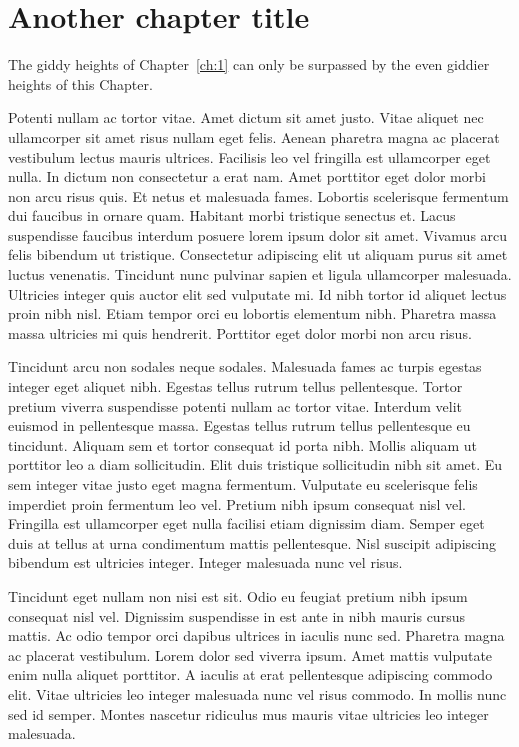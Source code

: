 
\chapter{Another chapter title} \label{ch:2}


The giddy heights of Chapter~\ref{ch:1} can only be surpassed by the even giddier heights of this Chapter.

Potenti nullam ac tortor vitae. Amet dictum sit amet justo. Vitae aliquet nec ullamcorper sit amet risus nullam eget felis. Aenean pharetra magna ac placerat vestibulum lectus mauris ultrices. Facilisis leo vel fringilla est ullamcorper eget nulla. In dictum non consectetur a erat nam. Amet porttitor eget dolor morbi non arcu risus quis. Et netus et malesuada fames. Lobortis scelerisque fermentum dui faucibus in ornare quam. Habitant morbi tristique senectus et. Lacus suspendisse faucibus interdum posuere lorem ipsum dolor sit amet. Vivamus arcu felis bibendum ut tristique. Consectetur adipiscing elit ut aliquam purus sit amet luctus venenatis. Tincidunt nunc pulvinar sapien et ligula ullamcorper malesuada. Ultricies integer quis auctor elit sed vulputate mi. Id nibh tortor id aliquet lectus proin nibh nisl. Etiam tempor orci eu lobortis elementum nibh. Pharetra massa massa ultricies mi quis hendrerit. Porttitor eget dolor morbi non arcu risus.

Tincidunt arcu non sodales neque sodales. Malesuada fames ac turpis egestas integer eget aliquet nibh. Egestas tellus rutrum tellus pellentesque. Tortor pretium viverra suspendisse potenti nullam ac tortor vitae. Interdum velit euismod in pellentesque massa. Egestas tellus rutrum tellus pellentesque eu tincidunt. Aliquam sem et tortor consequat id porta nibh. Mollis aliquam ut porttitor leo a diam sollicitudin. Elit duis tristique sollicitudin nibh sit amet. Eu sem integer vitae justo eget magna fermentum. Vulputate eu scelerisque felis imperdiet proin fermentum leo vel. Pretium nibh ipsum consequat nisl vel. Fringilla est ullamcorper eget nulla facilisi etiam dignissim diam. Semper eget duis at tellus at urna condimentum mattis pellentesque. Nisl suscipit adipiscing bibendum est ultricies integer. Integer malesuada nunc vel risus.

Tincidunt eget nullam non nisi est sit. Odio eu feugiat pretium nibh ipsum consequat nisl vel. Dignissim suspendisse in est ante in nibh mauris cursus mattis. Ac odio tempor orci dapibus ultrices in iaculis nunc sed. Pharetra magna ac placerat vestibulum. Lorem dolor sed viverra ipsum. Amet mattis vulputate enim nulla aliquet porttitor. A iaculis at erat pellentesque adipiscing commodo elit. Vitae ultricies leo integer malesuada nunc vel risus commodo. In mollis nunc sed id semper. Montes nascetur ridiculus mus mauris vitae ultricies leo integer malesuada.

